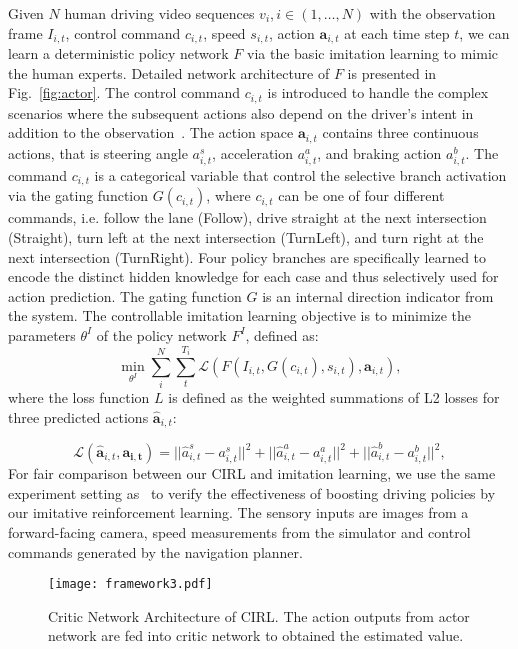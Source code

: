 \documentclass[runningheads]{llncs}
\begin{document}
Given $N$ human driving video sequences $v_i, i\in (1,\dots, N)$ with the observation frame $I_{i,t}$, control command $c_{i,t}$, speed $s_{i,t}$, action $\mathbf{a}_{i,t}$ at each time step $t$, we can learn a deterministic policy network $F$ via the basic imitation learning to mimic the human experts. Detailed network architecture of $F$ is presented in Fig.~\ref{fig:actor}. The control command $c_{i,t}$ is introduced to handle the complex scenarios where the subsequent actions also depend on the driver's intent in addition to the observation~\cite{codevilla2017end}. The
action space $\mathbf{a}_{i,t}$ contains three continuous actions, that is steering angle $a^s_{i,t}$, acceleration $a^a_{i,t}$, and braking action $a^b_{i,t}$. The command $c_{i,t}$ is a categorical variable that control the selective branch activation via the gating function $G(c_{i,t})$, where $c_{i,t}$ can be one of four different commands, i.e. follow the lane (Follow), drive straight at the next intersection (Straight), turn left at the next intersection (TurnLeft), and turn right at the next intersection (TurnRight). Four policy branches are specifically learned to encode the distinct hidden knowledge for each case and thus selectively used for action prediction. 
The gating function $G$ is an internal direction indicator from the system. The controllable imitation learning objective is to minimize the parameters $\theta^I$ of the policy network $F^I$, defined as:
\begin{equation}
\min_{\theta^I} \sum_i^N\sum_t^{T_i}\mathcal{L}(F(I_{i,t},G(c_{i,t}), s_{i,t}), \mathbf{a}_{i,t}),
\label{eq:imitation}
\end{equation}
where the loss function $L$ is defined as the weighted summations of L2 losses for three predicted actions $\mathbf{\hat{a}}_{i,t}$:

\begin{equation}
\mathcal{L}(\mathbf{\hat{a}}_{i,t}, \mathbf{a_{i,t}}) = ||\hat{a}^s_{i,t}-a^s_{i,t}||^2 + ||\hat{a}^a_{i,t}-a^a_{i,t}||^2 + ||\hat{a}^b_{i,t}-a^b_{i,t}||^2,
\end{equation}
For fair comparison between our CIRL and imitation learning, we use the same  experiment setting as~\cite{dosovitskiy2017carla} to verify the effectiveness of boosting driving policies by our imitative reinforcement learning. The sensory inputs are images from a forward-facing camera, speed measurements from the simulator and control commands generated by the navigation planner.


\begin{figure*}[!tp]
        \begin{center}
     \texttt{[image: framework3.pdf]}\vspace{-3mm}
            \caption{Critic Network Architecture of CIRL. The action outputs from actor network are fed into critic network to obtained the estimated value.}\vspace{-5mm}
            \label{fig:critic}
        \end{center}
    \end{figure*}
    
\end{document}
